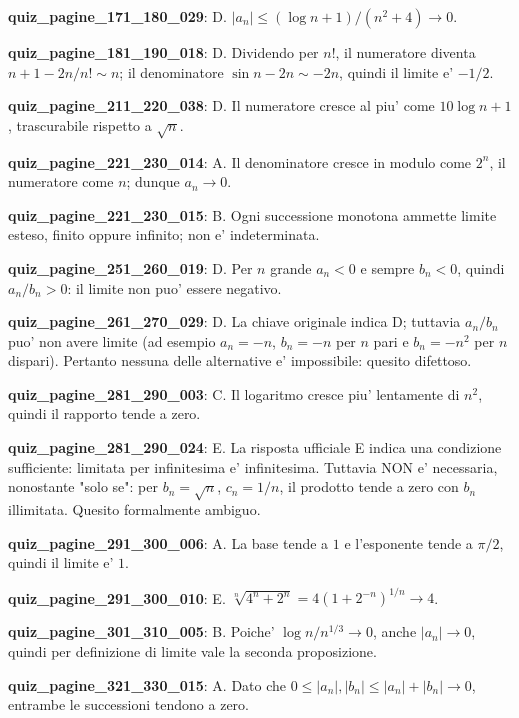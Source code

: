 \documentclass[11pt,a4paper]{article}
\newcounter{quiz}
\begin{document}
\noindent\textbf{quiz\_pagine\_171\_180\_029}: D. $|a_n|\leq(\log n+1)/(n^2+4)\to0$.\par\medskip
\noindent\textbf{quiz\_pagine\_181\_190\_018}: D. Dividendo per $n!$, il numeratore diventa $n+1-2n/n!\sim n$; il denominatore $\sin n-2n\sim-2n$, quindi il limite e' $-1/2$.\par\medskip
\noindent\textbf{quiz\_pagine\_211\_220\_038}: D. Il numeratore cresce al piu' come $10\log n+1$, trascurabile rispetto a $\sqrt n$.\par\medskip
\noindent\textbf{quiz\_pagine\_221\_230\_014}: A. Il denominatore cresce in modulo come $2^n$, il numeratore come $n$; dunque $a_n\to0$.\par\medskip
\noindent\textbf{quiz\_pagine\_221\_230\_015}: B. Ogni successione monotona ammette limite esteso, finito oppure infinito; non e' indeterminata.\par\medskip
\noindent\textbf{quiz\_pagine\_251\_260\_019}: D. Per $n$ grande $a_n<0$ e sempre $b_n<0$, quindi $a_n/b_n>0$: il limite non puo' essere negativo.\par\medskip
\noindent\textbf{quiz\_pagine\_261\_270\_029}: D. La chiave originale indica D; tuttavia $a_n/b_n$ puo' non avere limite (ad esempio $a_n=-n$, $b_n=-n$ per $n$ pari e $b_n=-n^2$ per $n$ dispari). Pertanto nessuna delle alternative e' impossibile: quesito difettoso.\par\medskip
\noindent\textbf{quiz\_pagine\_281\_290\_003}: C. Il logaritmo cresce piu' lentamente di $n^2$, quindi il rapporto tende a zero.\par\medskip
\noindent\textbf{quiz\_pagine\_281\_290\_024}: E. La risposta ufficiale E indica una condizione sufficiente: limitata per infinitesima e' infinitesima. Tuttavia NON e' necessaria, nonostante "solo se": per $b_n=\sqrt n$, $c_n=1/n$, il prodotto tende a zero con $b_n$ illimitata. Quesito formalmente ambiguo.\par\medskip
\noindent\textbf{quiz\_pagine\_291\_300\_006}: A. La base tende a $1$ e l'esponente tende a $\pi/2$, quindi il limite e' $1$.\par\medskip
\noindent\textbf{quiz\_pagine\_291\_300\_010}: E. $\sqrt[n]{4^n+2^n}=4(1+2^{-n})^{1/n}\to4$.\par\medskip
\noindent\textbf{quiz\_pagine\_301\_310\_005}: B. Poiche' $\log n/n^{1/3}\to0$, anche $|a_n|\to0$, quindi per definizione di limite vale la seconda proposizione.\par\medskip
\noindent\textbf{quiz\_pagine\_321\_330\_015}: A. Dato che $0\leq|a_n|,|b_n|\leq|a_n|+|b_n|\to0$, entrambe le successioni tendono a zero.\par\medskip
\end{document}
